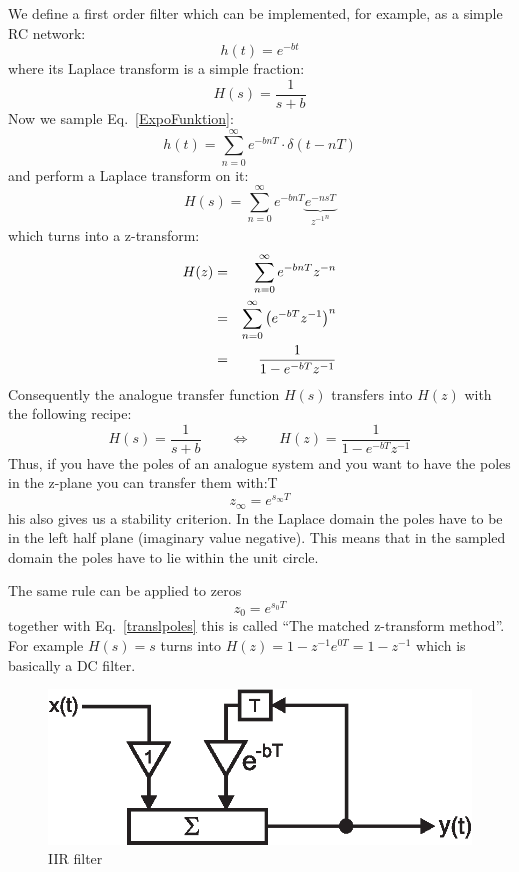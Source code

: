 \documentclass[12pt,a4paper]{article}
\begin{document}
We define a first order filter which can be implemented, for example, as
a simple RC network:
\begin{equation}
h(t)=e^{-bt}
\label{ExpoFunktion}
\end{equation}
where its Laplace transform is a simple fraction:
\begin{equation}
H(s)=\frac{1}{s+b}
\end{equation}
Now we sample Eq.~\ref{ExpoFunktion}:
\begin{equation}
h(t)=\sum_{n=0}^\infty e^{-bnT} \cdot \delta(t-nT)
\end{equation}
and perform a Laplace transform on it:
\begin{equation}
H(s) = \sum_{n=0}^\infty e^{-bnT} \underbrace{e^{-nsT}}_{{z^{-1}}^n}
\end{equation}
which turns into a z-transform:
\begin{eqnarray}
H(z)&=&\sum_{n=0}^\infty e^{-bnT} z^{-n} \\
    &=&\sum_{n=0}^\infty {\left(e^{-bT} z^{-1}\right)}^n \\
    &=&{1\over 1-e^{-bT} z^{-1}}  \label{IIReq}
\end{eqnarray}
Consequently the analogue transfer function $H(s)$
transfers into $H(z)$ with the following recipe:
\begin{equation}
H(s)=\frac{1}{s+b} \qquad\Leftrightarrow\qquad
H(z)=\frac{1}{1-e^{-bT} z^{-1}} \label{impInv}
\end{equation}
Thus, if you have the poles of an analogue system and you want
to have the poles in the z-plane you can transfer them with:T
\begin{equation}
z_\infty=e^{s_\infty T}
\label{translpoles}
\end{equation}
his also gives us a stability criterion. In the Laplace domain
the poles have to be in the left half plane (imaginary value negative).
This means that in the sampled domain the poles have to lie within
the unit circle.

The same rule can be applied to zeros
\begin{equation}
z_0=e^{s_0 T} \label{matchedz}
\label{transzeros}
\end{equation}
together with Eq.~\ref{translpoles} this is called ``The matched
z-transform method''. For example $H(s)=s$ turns into
$H(z)=1-z^{-1}e^{0T}=1-z^{-1}$ which is basically a DC filter.


\begin{figure}[!hbt]
\begin{center}
\mbox{\includegraphics[width=0.75\linewidth]{iir}}
\caption{IIR filter \label{IIRfilter}}
\end{center}
\end{figure}
\end{document}
